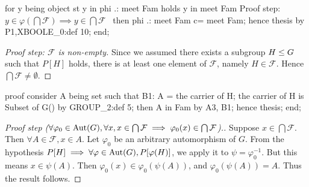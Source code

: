   for y being object st y in phi .: meet Fam
  holds y in meet Fam
  \LA{}Proof step: $y\in\varphi(\bigcap\mathcal{F})\implies y\in\bigcap\mathcal{F}$~{\nwtagstyle{}}\RA{}
  then phi .: meet Fam c= meet Fam;
  hence thesis by P1,XBOOLE_0:def 10;
end;
\eatline
{}\nwendcode{}\nwdocspar
\begin{proof}[Proof step: $\mathcal{F}$ is non-empty]
Since we assumed there exists a subgroup $H\leq G$ such that $P[H]$
holds, there is at least one element of $\mathcal{F}$, namely
$H\in\mathcal{F}$. Hence $\bigcap\mathcal{F}\neq\emptyset$.
\end{proof}

\nwenddocs{}\endmoddef\nwstartdeflinemarkup{}\nwenddeflinemarkup
proof
  consider A being set such that
  B1: A = the carrier of H;
  the carrier of H is Subset of G() by GROUP_2:def 5;
  then A in Fam by A3, B1;
  hence thesis;
end;
\nwendcode{}\nwdocspar

\begin{proof}[Proof step ($\forall\varphi_{0}\in\operatorname{Aut}(G),\forall x, x\in\bigcap\mathcal{F}\implies\varphi_{0}(x)\in\bigcap\mathcal{F}$).]
Suppose $x\in\bigcap\mathcal{F}$. Then $\forall A\in\mathcal{F},x\in A$.
Let $\varphi_{0}$ be an arbitrary automorphism of $G$.
From the hypothesis $P[H]\implies \forall\varphi\in\operatorname{Aut}(G),
P[\varphi(H)]$, we apply it to $\psi=\varphi_{0}^{-1}$. But this means $x\in\psi(A)$.
Then $\varphi_{0}(x)\in\varphi_{0}(\psi(A))$, and $\varphi_{0}(\psi(A))=A$. Thus the
result follows.
\end{proof}

